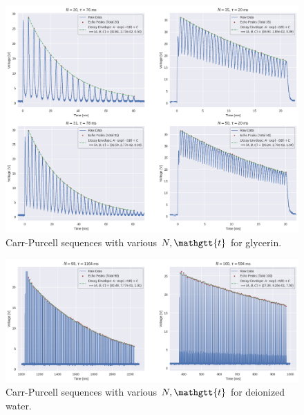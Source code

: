 \documentclass[
    floatfix,  %
    reprint,
    amsmath,
    amssymb,
    aps,
]{revtex4-2}
\newcommand{\taucode}{\mathgtt{t}}
\begin{document}
\begin{figure}[htbp]
    \centering
    \includegraphics[width=\textwidth]{figs/purcell/glycerin.png}
    \caption{Carr-Purcell sequences with various $N, \taucode$ for glycerin.}
    \label{fig:purcell/glycerin}
\end{figure}

\begin{figure}[htbp]
    \centering
    \includegraphics[width=\textwidth]{figs/purcell/water.png}
    \caption{Carr-Purcell sequences with various $N, \taucode$ for deionized water.}
    \label{fig:purcell/water}
\end{figure}


\twocolumngrid



















\end{document}
